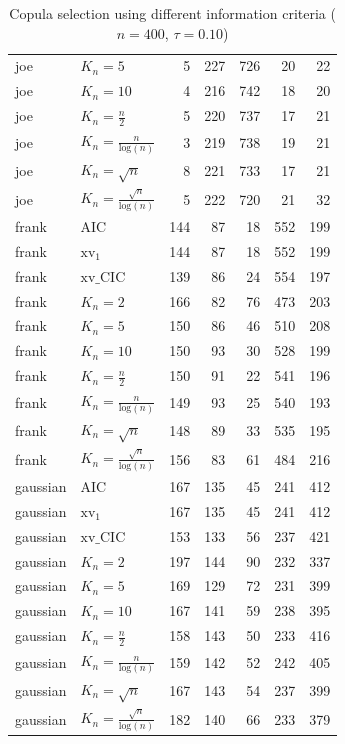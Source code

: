 \begin{table}[htbp]
\begin{tabular}{llrrrrr}
  joe & $K_{n}=5$ & 5 & 227 & 726 & 20 & 22 \\ 
  joe & $K_{n}=10$ & 4 & 216 & 742 & 18 & 20 \\ 
  joe & $K_{n}=\tfrac{n}{2}$ & 5 & 220 & 737 & 17 & 21 \\ 
  joe & $K_{n}=\tfrac{n}{\text{log}(n)}$ & 3 & 219 & 738 & 19 & 21 \\ 
  joe & $K_{n}=\sqrt{n}$ & 8 & 221 & 733 & 17 & 21 \\ 
  joe & $K_{n}=\tfrac{\sqrt{n}}{\text{log}(n)}$ & 5 & 222 & 720 & 21 & 32 \\ 
   \hdashline
frank & AIC & 144 & 87 & 18 & 552 & 199 \\ 
  frank & $\text{xv}_{1}$ & 144 & 87 & 18 & 552 & 199 \\ 
  frank & $\text{xv}\_\text{CIC}$ & 139 & 86 & 24 & 554 & 197 \\ 
  frank & $K_{n}=2$ & 166 & 82 & 76 & 473 & 203 \\ 
  frank & $K_{n}=5$ & 150 & 86 & 46 & 510 & 208 \\ 
  frank & $K_{n}=10$ & 150 & 93 & 30 & 528 & 199 \\ 
  frank & $K_{n}=\tfrac{n}{2}$ & 150 & 91 & 22 & 541 & 196 \\ 
  frank & $K_{n}=\tfrac{n}{\text{log}(n)}$ & 149 & 93 & 25 & 540 & 193 \\ 
  frank & $K_{n}=\sqrt{n}$ & 148 & 89 & 33 & 535 & 195 \\ 
  frank & $K_{n}=\tfrac{\sqrt{n}}{\text{log}(n)}$ & 156 & 83 & 61 & 484 & 216 \\ 
   \hdashline
gaussian & AIC & 167 & 135 & 45 & 241 & 412 \\ 
  gaussian & $\text{xv}_{1}$ & 167 & 135 & 45 & 241 & 412 \\ 
  gaussian & $\text{xv}\_\text{CIC}$ & 153 & 133 & 56 & 237 & 421 \\ 
  gaussian & $K_{n}=2$ & 197 & 144 & 90 & 232 & 337 \\ 
  gaussian & $K_{n}=5$ & 169 & 129 & 72 & 231 & 399 \\ 
  gaussian & $K_{n}=10$ & 167 & 141 & 59 & 238 & 395 \\ 
  gaussian & $K_{n}=\tfrac{n}{2}$ & 158 & 143 & 50 & 233 & 416 \\ 
  gaussian & $K_{n}=\tfrac{n}{\text{log}(n)}$ & 159 & 142 & 52 & 242 & 405 \\ 
  gaussian & $K_{n}=\sqrt{n}$ & 167 & 143 & 54 & 237 & 399 \\ 
  gaussian & $K_{n}=\tfrac{\sqrt{n}}{\text{log}(n)}$ & 182 & 140 & 66 & 233 & 379 \\ 
   \hline
\end{tabular}
\caption{Copula selection using different information criteria ($n = 400$, $\tau = 0.10$)} 
\end{table}


